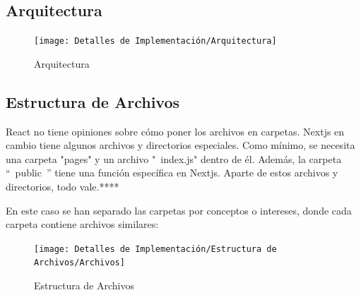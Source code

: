 \documentclass[12pt,twoside,titlepage]{report}
\begin{document}
\subsection{Arquitectura}
\begin{figure}[H]
    \centering
    \texttt{[image: Detalles de Implementación/Arquitectura]}
    \label{fig:Arquitectura}
    \caption{Arquitectura}
\end{figure}

\subsection{Estructura de Archivos}

React no tiene opiniones sobre cómo poner los archivos en carpetas. Nextjs en cambio tiene algunos archivos y directorios especiales. Como mínimo, se necesita una carpeta "pages" y un archivo " index.js" dentro de él. Además, la carpeta “ public ” tiene una función específica en Nextjs. Aparte de estos archivos y directorios, todo vale.****

En este caso se han separado las carpetas por conceptos o intereses, donde cada carpeta contiene archivos similares:

\begin{figure}[H]
    \centering
    \texttt{[image: Detalles de Implementación/Estructura de Archivos/Archivos]}
    \label{fig:Archivos}
    \caption{Estructura de Archivos}
\end{figure}
\end{document}
